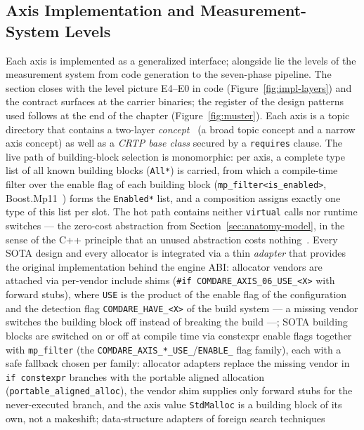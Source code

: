 \begin{nurlang}
\section{Axis Implementation and Measurement-System Levels}\label{sec:axes-impl}
Each axis is implemented as a generalized interface; alongside lie the levels of the measurement system
from code generation to the seven-phase pipeline. The section closes with the level picture E4--E0 in
code (Figure~\ref{fig:impl-layers}) and the contract surfaces at the carrier binaries; the register of
the design patterns used follows at the end of the chapter (Figure~\ref{fig:muster}).
Each axis is a topic directory that contains a two-layer \emph{concept}~\cite{sutton2012concepts} (a
broad topic concept and a narrow axis concept) as well as a \emph{CRTP base class} secured by a
\texttt{requires} clause. The live path of building-block selection is monomorphic: per axis, a
complete type list of all known building blocks (\texttt{All*}) is carried, from which a compile-time
filter over the enable flag of each building block (\texttt{mp\_filter<is\_enabled>},
Boost.Mp11~\cite{dimov_mp11}) forms the \texttt{Enabled*} list, and a composition assigns exactly one
type of this list per slot. The hot path contains neither \texttt{virtual} calls nor runtime switches
--- the zero-cost abstraction from Section~\ref{sec:anatomy-model}, in the sense of the C++ principle
that an unused abstraction costs nothing~\cite{stroustrup2012foundations}. Every SOTA design and every
allocator is integrated via a thin \emph{adapter} that provides the original implementation behind the
engine ABI\@: allocator vendors are attached via per-vendor include shims
(\texttt{\#if COMDARE\_AXIS\_06\_USE\_<X>} with forward stubs), where \texttt{USE} is the product of the
enable flag of the configuration and the detection flag \texttt{COMDARE\_HAVE\_<X>} of the build system
--- a missing vendor switches the building block off instead of breaking the build ---; SOTA building
blocks are switched on or off at compile time via constexpr enable flags together with
\texttt{mp\_filter} (the \texttt{COMDARE\_AXIS\_*\_USE\_}/\texttt{ENABLE\_} flag family), each with a
safe fallback chosen per family: allocator adapters replace the missing vendor in \texttt{if constexpr}
branches with the portable aligned allocation (\texttt{portable\_aligned\_alloc}), the vendor shim
supplies only forward stubs for the never-executed branch, and the axis value \texttt{StdMalloc} is a
building block of its own, not a makeshift; data-structure adapters of foreign search techniques

\end{nurlang}
